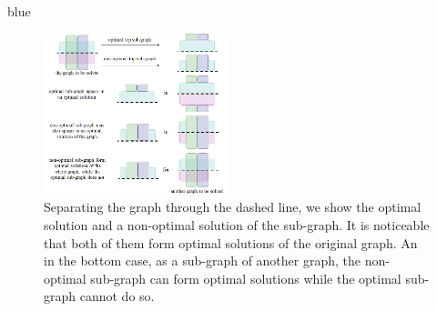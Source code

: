 \documentclass[journal]{IEEEtran}
\begin{document}
\begin{color}{blue}
\begin{figure}[t]
\centering
\includegraphics[width=0.48\textwidth]{figures/local_combined}
\caption{Separating the graph through the dashed line, we show the optimal solution and a non-optimal solution of the sub-graph. It is noticeable that both of them form optimal solutions of the original graph. An in the bottom case, as a sub-graph of another graph, the non-optimal sub-graph can form optimal solutions while the optimal sub-graph cannot do so. }\label{fig:local_combined}
\end{figure}



\end{color}
\end{document}
